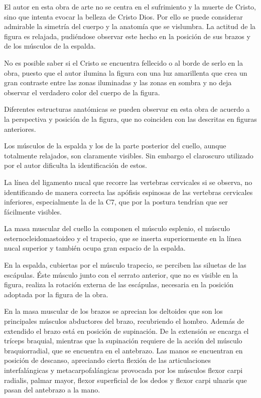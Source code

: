 El autor en esta obra de arte no se centra en el sufrimiento y la muerte de Cristo, sino que intenta evocar la belleza de Cristo Dios. Por ello se puede considerar admirable la simetría del cuerpo y la anatomía que se vislumbra. La actitud de la figura es relajada, pudiéndose observar este hecho en la posición de sus brazos y de los músculos de la espalda.

No es posible saber si el Cristo se encuentra fellecido o al borde de serlo en la obra, puesto que el autor ilumina la figura con una luz amarillenta que crea un gran contraste entre las zonas iluminadas y las zonas en sombra y no deja observar el verdadero color del cuerpo de la figura.

Diferentes estructuras anatómicas se pueden observar en esta obra de acuerdo a la perspectiva y posición de la figura, que no coinciden con las descritas en figuras anteriores.

Los músculos de la espalda y los de la parte posterior del cuello, aunque totalmente relajados, son claramente visibles. Sin embargo el claroscuro utilizado por el autor dificulta la identificación de estos.

La línea del ligamento nucal que recorre las vertebras cervicales si se observa, no identificando de manera correcta las apófisis espinosas de las vertebras cervicales inferiores, especialmente la de la C7, que por la postura tendrían que ser fácilmente visibles. 

La masa muscular del cuello la componen el músculo esplenio, el músculo esternocleidomastoideo y el trapecio, que se inserta superiormente en la línea nucal superior y también ocupa gran espacio de la espalda.

En la espalda, cubiertas por el músculo trapecio, se perciben las siluetas de las escápulas. Éste músculo junto con  el serrato anterior, que no es visible en la figura, realiza la rotación externa de las escápulas, necesaria en la posición adoptada por la figura de la obra.

En la masa muscular de los brazos se aprecian los deltoides que son los principales músculos abductores del brazo, recubriendo el hombro. Además de extendido el brazo está en posición de supinación. De la extensión se encarga el tríceps braquial, mientras que la supinación requiere de la acción del músculo braquiorradial, que se encuentra en el antebrazo. Las manos se encuentran en posición de descanso, apreciando cierta flexión de las articulaciones interfalángicas y metacarpofalángicas provocada por los músculos flexor carpi radialis, palmar mayor, flexor superficial de los dedos y flexor carpi ulnaris que pasan del antebrazo a la mano.


